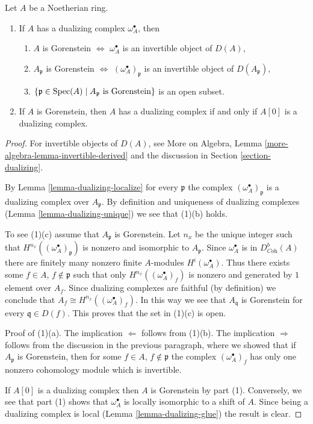 \begin{lemma}
\label{lemma-gorenstein}
Let $A$ be a Noetherian ring.
\begin{enumerate}
\item If $A$ has a dualizing complex $\omega_A^\bullet$, then
\begin{enumerate}
\item $A$ is Gorenstein $\Leftrightarrow$ $\omega_A^\bullet$ is an invertible
object of $D(A)$,
\item $A_\mathfrak p$ is Gorenstein $\Leftrightarrow$
$(\omega_A^\bullet)_\mathfrak p$ is an invertible object of
$D(A_\mathfrak p)$,
\item $\{\mathfrak p \in \mathop{\mathrm{Spec}}(A) \mid A_\mathfrak p\text{ is Gorenstein}\}$
is an open subset.
\end{enumerate}
\item If $A$ is Gorenstein, then $A$ has a dualizing complex if and
only if $A[0]$ is a dualizing complex.
\end{enumerate}
\end{lemma}

\begin{proof}
For invertible objects of $D(A)$, see
More on Algebra, Lemma \ref{more-algebra-lemma-invertible-derived}
and the discussion in Section \ref{section-dualizing}.

\medskip\noindent
By Lemma \ref{lemma-dualizing-localize} for every
$\mathfrak p$ the complex $(\omega_A^\bullet)_\mathfrak p$ is a
dualizing complex over $A_\mathfrak p$. By definition and uniqueness
of dualizing complexes (Lemma \ref{lemma-dualizing-unique})
we see that (1)(b) holds.

\medskip\noindent
To see (1)(c) assume that $A_\mathfrak p$ is Gorenstein.
Let $n_x$ be the unique integer such that
$H^{n_{x}}((\omega_A^\bullet)_\mathfrak p)$
is nonzero and isomorphic to $A_\mathfrak p$.
Since $\omega_A^\bullet$ is in $D^b_{\textit{Coh}}(A)$
there are finitely many nonzero finite $A$-modules
$H^i(\omega_A^\bullet)$. Thus there exists some
$f \in A$, $f \not \in \mathfrak p$
such that only $H^{n_x}((\omega_A^\bullet)_f)$
is nonzero and generated by $1$ element over $A_f$.
Since dualizing complexes are faithful (by definition)
we conclude that $A_f \cong H^{n_x}((\omega_A^\bullet)_f)$.
In this way we see that $A_\mathfrak q$ is Gorenstein
for every $\mathfrak q \in D(f)$. This proves that the set
in (1)(c) is open.

\medskip\noindent
Proof of (1)(a). The implication $\Leftarrow$ follows from (1)(b).
The implication $\Rightarrow$ follows from the discussion
in the previous paragraph, where we showed that if $A_\mathfrak p$
is Gorenstein, then for some $f \in A$, $f \not \in \mathfrak p$
the complex $(\omega_A^\bullet)_f$ has only one nonzero cohomology module
which is invertible.

\medskip\noindent
If $A[0]$ is a dualizing complex then $A$ is Gorenstein by
part (1). Conversely, we see that part (1) shows that
$\omega_A^\bullet$ is locally isomorphic to a shift of $A$.
Since being a dualizing complex is local
(Lemma \ref{lemma-dualizing-glue})
the result is clear.
\end{proof}

